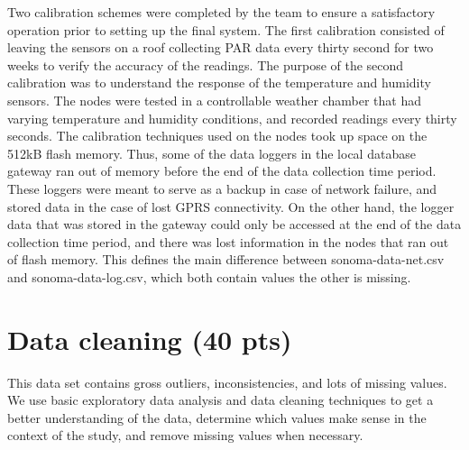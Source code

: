 \documentclass[11pt]{article}
\begin{document}
Two calibration schemes were completed by the team to ensure a satisfactory operation prior to setting up the final system. The first calibration consisted of leaving the sensors on a roof collecting PAR data every thirty second for two weeks to verify the accuracy of the readings. The purpose of the second calibration was to understand the response of the temperature and humidity sensors. The nodes were tested in a controllable weather chamber that had varying temperature and humidity conditions, and recorded readings every thirty seconds. The calibration techniques used on the nodes took up space on the 512kB flash memory. Thus, some of the data loggers in the local database gateway ran out of memory before the end of the data collection time period. These loggers were meant to serve as a backup in case of network failure, and stored data in the case of lost GPRS connectivity. On the other hand, the logger data that was stored in the gateway could only be accessed at the end of the data collection time period, and there was lost information in the nodes that ran out of flash memory. This defines the main difference between sonoma-data-net.csv and sonoma-data-log.csv, which both contain values the other is missing.

\section{Data cleaning (40 pts)}

This data set contains gross outliers, inconsistencies, and lots of missing values. We use basic exploratory data analysis and data cleaning techniques to get a better understanding of the data, determine which values make sense in the context of the study, and remove missing values when necessary.
\end{document}
